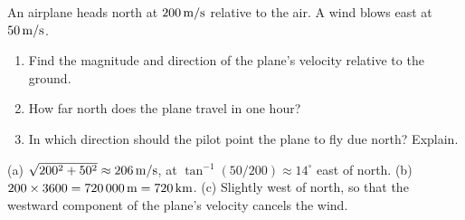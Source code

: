 \begin{exo}{}
An airplane heads north at $200\,\mathrm{m/s}$ relative to the air. A wind blows east at $50\,\mathrm{m/s}$.
\begin{enumerate}[label=(\alph*)]
\item Find the magnitude and direction of the plane's velocity relative to the ground.
\item How far north does the plane travel in one hour?
\item In which direction should the pilot point the plane to fly due north? Explain.
\end{enumerate}
\work{4.5cm}
\begin{solution}
(a) $\sqrt{200^2+50^2}\approx206\,\mathrm{m/s}$, at $\tan^{-1}(50/200)\approx14^\circ$ east of north. \;(b) $200\times3600=720\,000\,\mathrm{m}=720\,\mathrm{km}$. \;(c) Slightly west of north, so that the westward component of the plane's velocity cancels the wind.
\end{solution}
\end{exo}

